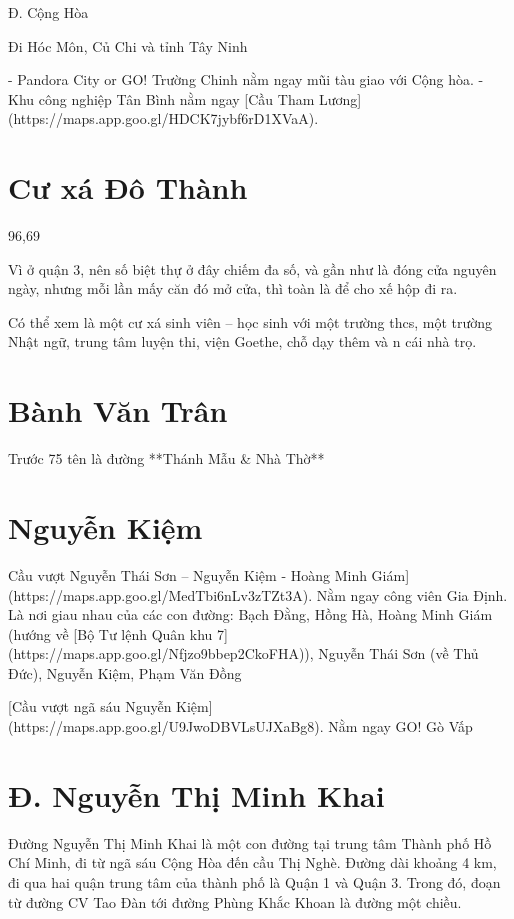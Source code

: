 Đ. Cộng Hòa

Đi Hóc Môn, Củ Chi và tỉnh Tây Ninh

- Pandora City or GO! Trường Chinh nằm ngay mũi tàu giao với Cộng hòa.
- Khu công nghiệp Tân Bình nằm ngay [Cầu Tham Lương](https://maps.app.goo.gl/HDCK7jybf6rD1XVaA).

\section{Cư xá Đô Thành}

96,69%

Vì ở quận 3, nên số biệt thự ở đây chiếm đa số, và gần như là đóng cửa nguyên ngày, nhưng mỗi lần mấy căn đó mở cửa, thì toàn là để cho xế hộp đi ra.

Có thể xem là một cư xá sinh viên – học sinh với một trường thcs, một trường Nhật ngữ, trung tâm luyện thi, viện Goethe, chỗ dạy thêm và n cái nhà trọ.

\section{Bành Văn Trân}

Trước 75 tên là đường **Thánh Mẫu \& Nhà Thờ**

\section{Nguyễn Kiệm}

Cầu vượt Nguyễn Thái Sơn – Nguyễn Kiệm - Hoàng Minh Giám](https://maps.app.goo.gl/MedTbi6nLv3zTZt3A). Nằm ngay công viên Gia Định. Là nơi giau nhau của các con đường: Bạch Đằng, Hồng Hà, Hoàng Minh Giám (hướng về [Bộ Tư lệnh Quân khu 7](https://maps.app.goo.gl/Nfjzo9bbep2CkoFHA)), Nguyễn Thái Sơn (về Thủ Đức), Nguyễn Kiệm, Phạm Văn Đồng

[Cầu vượt ngã sáu Nguyễn Kiệm](https://maps.app.goo.gl/U9JwoDBVLsUJXaBg8). Nằm ngay GO! Gò Vấp

\section{Đ. Nguyễn Thị Minh Khai}

Đường Nguyễn Thị Minh Khai là một con đường tại trung tâm Thành phố Hồ Chí Minh, đi từ ngã sáu Cộng Hòa đến cầu Thị Nghè. Đường dài khoảng 4 km, đi qua hai quận trung tâm của thành phố là Quận 1 và Quận 3. Trong đó, đoạn từ đường CV Tao Đàn tới đường Phùng Khắc Khoan là đường một chiều.


